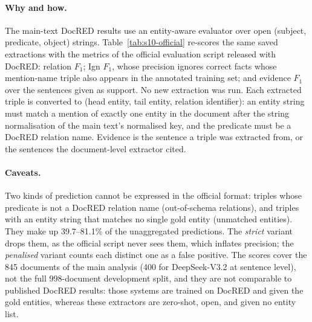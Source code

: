 \documentclass[11pt]{article}
\begin{document}
\paragraph{Why and how.} The main-text DocRED results use an
entity-aware evaluator over open (subject, predicate, object) strings.
Table~\ref{tab:s10-official} re-scores the same saved extractions with
the metrics of the official evaluation script released with DocRED:
relation $F_1$; Ign $F_1$, whose precision
ignores correct facts whose mention-name triple also appears in the
annotated training set; and evidence $F_1$ over the sentences given as
support. No new extraction was run. Each extracted triple is converted
to (head entity, tail entity, relation identifier): an entity string
must match a mention of exactly one entity in the document after the
string normalisation of the main text's normalised key, and the predicate must be a DocRED
relation name. Evidence is the sentence a triple was extracted from, or
the sentences the document-level extractor cited.

\paragraph{Caveats.} Two kinds of prediction cannot be expressed in the
official format: triples whose predicate is not a DocRED relation name
(out-of-schema relations), and triples with an entity string that
matches no single gold entity (unmatched entities). They make up
39.7--81.1\% of the unaggregated predictions. The \emph{strict} variant
drops them, as the official script never sees them, which inflates
precision; the \emph{penalised} variant counts each distinct one as a
false positive. The scores cover the 845 documents of the main
analysis (400 for DeepSeek-V3.2 at sentence level), not the full
998-document development split, and they are not comparable to
published DocRED results: those systems are trained on DocRED and
given the gold entities, whereas these extractors are zero-shot, open,
and given no entity list.
\end{document}
